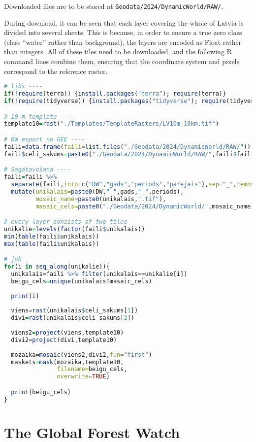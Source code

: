 \documentclass[
]{book}
\newcommand{\passthrough}[1]{#1}
\begin{document}
Downloaded files are to be stored at \passthrough{\lstinline!Geodata/2024/DynamicWorld/RAW/!}.

During download, it can be seen that each layer covering the whole of Latvia is
divided into several sheets. This is because, in order to ensure a true zero
class (class ``water'' rather than background), the layers are encoded as Float
rather than integers. All of these tiles need to be downloaded, and the following
R command lines combine them, ensuring that the coordinate system and pixels
correspond to the reference raster.

\begin{lstlisting}[language=R]
# libs ----
if(!require(terra)) {install.packages("terra"); require(terra)}
if(!require(tidyverse)) {install.packages("tidyverse"); require(tidyverse)}

# 10 m template ----
template10=rast("./Templates/TemplateRasters/LV10m_10km.tif")

# DW export no GEE ----
faili=data.frame(faili=list.files("./Geodata/2024/DynamicWorld/RAW/"))
faili$celi_sakums=paste0("./Geodata/2024/DynamicWorld/RAW/",faili$faili)

# Sagatavošana ----
faili=faili %>% 
  separate(faili,into=c("DW","gads","periods","parejais"),sep="_",remove = FALSE) %>% 
  mutate(unikalais=paste0(DW,"_",gads,"_",periods),
         mosaic_name=paste0(unikalais,".tif"),
         masaic_cels=paste0("./Geodata/2024/DynamicWorld/",mosaic_name))

# every layer consists of two tiles
unikalie=levels(factor(faili$unikalais))
min(table(faili$unikalais))
max(table(faili$unikalais))

# job
for(i in seq_along(unikalie)){
  unikalais=faili %>% filter(unikalais==unikalie[i])
  beigu_cels=unique(unikalais$masaic_cels)
  
  print(i)
  
  viens=rast(unikalais$celi_sakums[1])
  divi=rast(unikalais$celi_sakums[2])
  
  viens2=project(viens,template10)
  divi2=project(divi,template10)
  
  mozaika=mosaic(viens2,divi2,fun="first")
  maskets=mask(mozaika,template10,
               filename=beigu_cels,
               overwrite=TRUE)

  print(beigu_cels)
}
\end{lstlisting}

\section{The Global Forest Watch}\label{Ch04.09}
\end{document}
